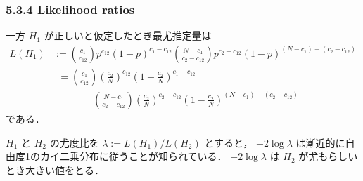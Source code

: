 \documentclass[9pt,leqno]{beamer}
\begin{document}
\begin{frame}   
    \frametitle{5.3.4 Likelihood ratios}
    一方 $H_1$ が正しいと仮定したとき最尤推定量は
    \begin{align*}
        L(H_1) &:= \binom{c_1}{c_{12}}p^{c_{12}}(1 - p)^{c_1 - c_{12}}
        \binom{ N - c_1}{c_2 - c_{12}}p^{c_2 - c_{12}}(1 - p)^{(N - c_1) - (c_2 - c_{12})} \\
        &\phantom{:}= \binom{c_1}{c_{12}}\left(\frac{c_2}{N}\right)^{c_{12}}\left(1 - \frac{c_2}{N}\right)^{c_1 - c_{12}} \\
        & \qquad \qquad \binom{ N - c_1}{c_2 - c_{12}}\left(\frac{c_2}{N}\right)^{c_2 - c_{12}}\left(1 - \frac{c_2}{N}\right)^{(N - c_1) - (c_2 - c_{12})}
    \end{align*}
    である．

    $H_1$ と $H_2$ の尤度比を $\lambda := L(H_1) / L(H_2)$ とすると，
    $-2 \log \lambda$ は漸近的に自由度1のカイ二乗分布に従うことが知られている．
    $-2 \log \lambda$ は $H_2$ が尤もらしいとき大きい値をとる．
    
\end{frame}
\end{document}
